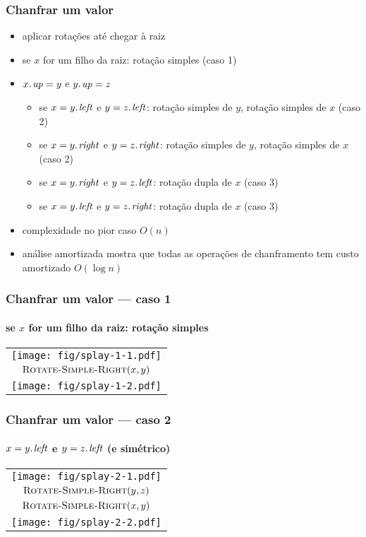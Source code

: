 \documentclass{beamer}
\begin{document}
\begin{frame}
\frametitle{Chanfrar um valor}

\begin{itemize}
\item aplicar rotações até chegar à raiz
\item se $x$ for um filho da raiz: rotação simples (\alert{caso 1})
\item $\attrib{x}{up} = y$ e $\attrib{y}{up} = z$
\begin{itemize}
\item se $x = \attrib{y}{left}$ e $y = \attrib{z}{left}$: rotação simples de $y$, rotação simples de $x$ (\alert{caso 2})
\item se $x = \attrib{y}{right}$ e $y = \attrib{z}{right}$: rotação simples de $y$, rotação simples de $x$  (\alert{caso 2})
\item se $x = \attrib{y}{right}$ e $y = \attrib{z}{left}$: rotação dupla de $x$  (\alert{caso 3})
\item se $x = \attrib{y}{left}$ e $y = \attrib{z}{right}$: rotação dupla de $x$  (\alert{caso 3})
\end{itemize}
\item complexidade no pior caso $O(n)$
\item análise amortizada mostra que todas as operações de chanframento tem
custo amortizado $O(\log n)$
\end{itemize}
\end{frame}

\begin{frame}
\frametitle{Chanfrar um valor --- caso 1}
\framesubtitle{se $x$ for um filho da raiz: rotação simples}

\begin{tabular}{c}
\texttt{[image: fig/splay-1-1.pdf]} \\
$\textnormal{\scshape Rotate-Simple-Right}(x, y)$ \\
\texttt{[image: fig/splay-1-2.pdf]}
\end{tabular}

\end{frame}

\begin{frame}
\frametitle{Chanfrar um valor --- caso 2}
\framesubtitle{$x = \attrib{y}{left}$ e $y = \attrib{z}{left}$ (e simétrico)}

\begin{tabular}{c}
\texttt{[image: fig/splay-2-1.pdf]} \\
$\textnormal{\scshape Rotate-Simple-Right}(y, z)$ \\
$\textnormal{\scshape Rotate-Simple-Right}(x, y)$ \\
\texttt{[image: fig/splay-2-2.pdf]}
\end{tabular}

\end{frame}
\end{document}
